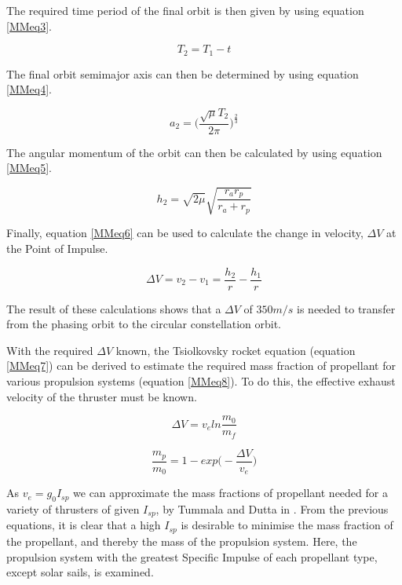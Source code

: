 The required time period of the final orbit is then given by using equation \ref{MMeq3}.

\begin{equation}
	T_2 = T_1 -t
	\label{MMeq3}
\end{equation}

The final orbit semimajor axis can then be determined by using equation \ref{MMeq4}.

\begin{equation}
	a_2 = \bigg(\frac{\sqrt{\mu}T_2}{2\pi}\bigg)^{\frac{2}{3}}
	\label{MMeq4}
\end{equation}

The angular momentum of the orbit can then be calculated by using equation \ref{MMeq5}.

\begin{equation}
	h_2 = \sqrt{2\mu}\sqrt{\frac{r_ar_p}{r_a+r_p}}
	\label{MMeq5}
\end{equation}

Finally, equation \ref{MMeq6} can be used to calculate the change in velocity,
$\Delta V$ at the Point of Impulse.

\begin{equation}
	\Delta V = v_2 - v_1 = \frac{h_2}{r}-\frac{h_1}{r}
	\label{MMeq6}
\end{equation}

The result of these calculations shows that a $\Delta V$ of $350 m/s$ is needed
to transfer from the phasing orbit to the circular constellation orbit.

With the required $\Delta V$ known, the Tsiolkovsky rocket equation (equation \ref{MMeq7})
can be derived to estimate the required mass fraction of propellant for various propulsion
systems (equation \ref{MMeq8}). To do this, the effective exhaust velocity of the thruster
must be known.

\begin{equation}
	\Delta V = v_e ln \frac{m_0}{m_f}
	\label{MMeq7}
\end{equation}

\begin{equation}
	\frac{m_p}{m_0} = 1-exp\bigg(-\frac{\Delta V}{v_e}\bigg)
	\label{MMeq8}
\end{equation}

As $v_e = g_0 I_{sp}$ we can approximate the mass fractions of propellant needed
for a variety of thrusters of given $I_{sp}$, by Tummala and Dutta in \cite{Tummala}.
From the previous equations, it is clear that a high $I_{sp}$ is desirable to
minimise the mass fraction of the propellant, and thereby the mass of the
propulsion system. Here, the propulsion system with the greatest Specific
Impulse of each propellant type, except solar sails, is examined.

